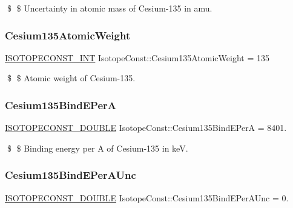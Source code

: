 \$ \$ Uncertainty in atomic mass of Cesium-\/135 in amu. \mbox{\label{group___isotope_const-_cesium-_cs135_ga22a2e87542f11d53d70c402f537568b9}} 
\subsubsection{\texorpdfstring{Cesium135\+Atomic\+Weight}{Cesium135AtomicWeight}}
{\footnotesize\ttfamily \mbox{\hyperlink{group___isotope_const-_macros_ga5f18360b3e99483a35c32d789e62621c}{I\+S\+O\+T\+O\+P\+E\+C\+O\+N\+S\+T\+\_\+\+I\+NT}} Isotope\+Const\+::\+Cesium135\+Atomic\+Weight = 135}

\$ \$ Atomic weight of Cesium-\/135. \mbox{\label{group___isotope_const-_cesium-_cs135_ga9d44af355926418ac28a0dbdb4846b73}} 
\subsubsection{\texorpdfstring{Cesium135\+Bind\+E\+PerA}{Cesium135BindEPerA}}
{\footnotesize\ttfamily \mbox{\hyperlink{group___isotope_const-_macros_ga8f45a7272ce02c0b4c65c44636ed719a}{I\+S\+O\+T\+O\+P\+E\+C\+O\+N\+S\+T\+\_\+\+D\+O\+U\+B\+LE}} Isotope\+Const\+::\+Cesium135\+Bind\+E\+PerA = 8401.}

\$ \$ Binding energy per A of Cesium-\/135 in keV. \mbox{\label{group___isotope_const-_cesium-_cs135_ga4b145b4ce18961ef3e150d643a212f1d}} 
\subsubsection{\texorpdfstring{Cesium135\+Bind\+E\+Per\+A\+Unc}{Cesium135BindEPerAUnc}}
{\footnotesize\ttfamily \mbox{\hyperlink{group___isotope_const-_macros_ga8f45a7272ce02c0b4c65c44636ed719a}{I\+S\+O\+T\+O\+P\+E\+C\+O\+N\+S\+T\+\_\+\+D\+O\+U\+B\+LE}} Isotope\+Const\+::\+Cesium135\+Bind\+E\+Per\+A\+Unc = 0.}

